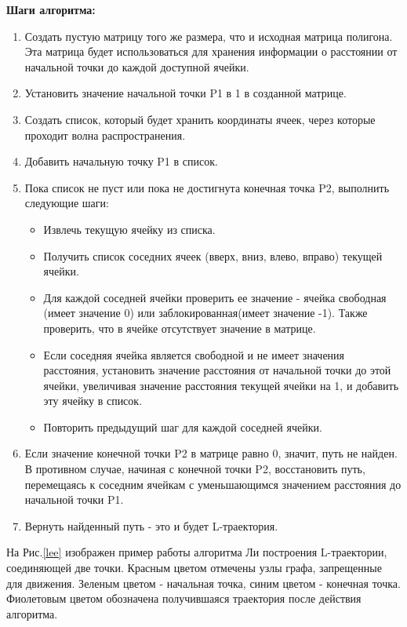 \documentclass[a4paper, 12pt]{article}
\begin{document}
    \textbf{Шаги алгоритма:}
    \begin{enumerate}
        \item Создать пустую матрицу того же размера, что и исходная матрица полигона. Эта матрица будет использоваться для хранения информации о расстоянии от начальной точки до каждой доступной ячейки.
        \item Установить значение начальной точки P1 в 1 в созданной матрице.
        \item Создать список, который будет хранить координаты ячеек, через которые проходит волна распространения.
        \item Добавить начальную точку P1 в список.
        \item Пока список не пуст или пока не достигнута конечная точка P2, выполнить следующие шаги:
        \begin{itemize}
            \item Извлечь текущую ячейку из списка.
            \item Получить список соседних ячеек (вверх, вниз, влево, вправо) текущей ячейки.
            \item Для каждой соседней ячейки проверить ее значение - ячейка свободная (имеет значение 0) или заблокированная(имеет значение -1). Также проверить, что в ячейке отсутствует значение в матрице.
            \item Если соседняя ячейка является свободной и не имеет значения расстояния, установить значение расстояния от начальной точки до этой ячейки, увеличивая значение расстояния текущей ячейки на 1, и добавить эту ячейку в список.
            \item Повторить предыдущий шаг для каждой соседней ячейки.
        \end{itemize}
        \item Если значение конечной точки P2 в матрице равно 0, значит, путь не найден. В противном случае, начиная с конечной точки P2, восстановить путь, перемещаясь к соседним ячейкам с уменьшающимся значением расстояния до начальной точки P1.
        \item Вернуть найденный путь - это и будет L-траектория.
    \end{enumerate}
    
    На Рис.\ref{lee} изображен пример работы алгоритма Ли построения L-траектории, соединяющей две точки. Красным цветом отмечены узлы графа, запрещенные для движения. Зеленым цветом - начальная точка, синим цветом - конечная точка. Фиолетовым цветом обозначена получившаяся траектория после действия алгоритма.
\end{document}
